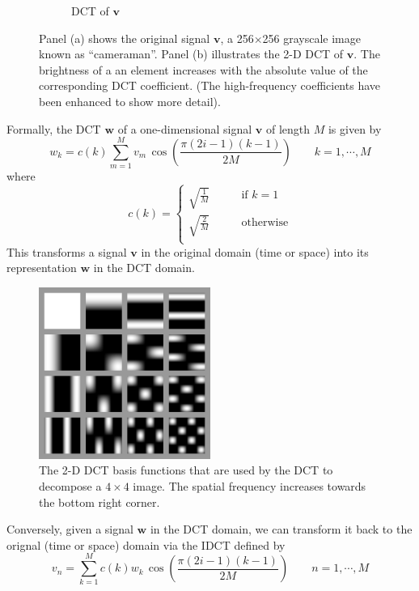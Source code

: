 \begin{figure}
\begin{subfigure}{0.45\textwidth}
    \caption{DCT of $\bm v$}
  \end{subfigure}
  \caption{Panel (a) shows the original signal $\bm v$, a 256$\times$256 grayscale image known as ``cameraman''. Panel (b) illustrates the 2-D DCT of $\bm v$. The brightness of a an element increases with the absolute value of the corresponding DCT coefficient. (The high-frequency coefficients have been enhanced to show more detail).}
  \label{fig:ch3:dct}
\end{figure}

Formally, the DCT $\bm w$ of a one-dimensional signal $\bm v$ of length $M$ is given by
\begin{equation}
  \label{eqn:dct_basis}
  w_k = c(k) \sum_{m=1}^{M} v_m \, \cos\left(\frac{\pi(2i-1)(k-1)}{2M}\right) \qquad k = 1,\cdots,M
\end{equation}
where
\begin{equation*}
  c(k) = \left\{\begin{array}{ll}
  \sqrt{\frac{1}{M}} & \qquad\mbox{if $k=1$}\\
  \sqrt{\frac{2}{M}} & \qquad\mbox{otherwise}\\
  \end{array}\right.
\end{equation*}
This transforms a signal $\bm v$ in the original domain (time or space) into its representation $\bm w$ in the DCT domain.

\begin{figure}
  \centering
  \includegraphics[width=0.5\textwidth]{Chapter3/Images/dct2functions.png}
  \caption{The 2-D DCT basis functions that are used by the DCT to decompose a $4\times 4$ image. 
    The spatial frequency increases towards the bottom right corner.}
  \label{fig:2D-DCT}
\end{figure}

Conversely, given a signal $\bm w$ in the DCT domain, we can transform it back to the orignal (time or space) domain via the IDCT defined by
\begin{equation}
  \label{eqn:idct}
  v_n = \sum_{k=1}^M c(k) w_k  \, \cos\left(\frac{\pi(2i-1)(k-1)}{2M}\right) \qquad n = 1,\cdots,M
\end{equation}

